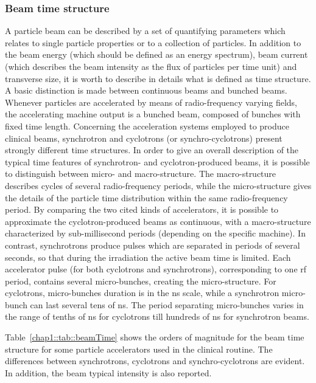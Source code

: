 \subsubsection{Beam time structure}\label{chap1::subsubsection::beamTimeStruct}

A particle beam can be described by a set of quantifying parameters which relates to single particle properties or to a collection of particles. In addition to the beam energy (which should be defined as an energy spectrum), beam current (which describes the beam intensity as the flux of particles per time unit) and transverse size, it is worth to describe in details what is defined as time structure. A basic distinction is made between continuous beams and bunched beams. Whenever particles are accelerated by means of radio-frequency varying fields, the accelerating machine output is a bunched beam, composed of bunches with fixed time length. Concerning the acceleration systems employed to produce clinical beams, synchrotron and cyclotrons (or synchro-cyclotrons) present strongly different time structures. In order to give an overall description of the typical time features of synchrotron- and cyclotron-produced beams, it is possible to distinguish between micro- and macro-structure. The macro-structure describes cycles of several radio-frequency periods, while the micro-structure gives the details of the particle time distribution within the same radio-frequency period. By comparing the two cited kinds of accelerators, it is possible to approximate the cyclotron-produced beams as continuous, with a macro-structure characterized by sub-millisecond periods (depending on the specific machine). In contrast, synchrotrons produce pulses which are separated in periods of several seconds, so that during the irradiation the active beam time is limited. Each accelerator pulse (for both cyclotrons and synchrotrons), corresponding to one \gls{rf} period, contains several micro-bunches, creating the micro-structure. For cyclotrons, micro-bunches duration is in the ns scale, while a synchrotron micro-bunch can last several tens of ns. The period separating micro-bunches varies in the range of tenths of ns for cyclotrons till hundreds of ns for synchrotron beams. 

Table~\ref{chap1::tab::beamTime} shows the orders of magnitude for the beam time structure for some particle accelerators used in the clinical routine. The differences between synchrotrons, cyclotrons and synchro-cyclotrons are evident. In addition, the beam typical intensity is also reported.

